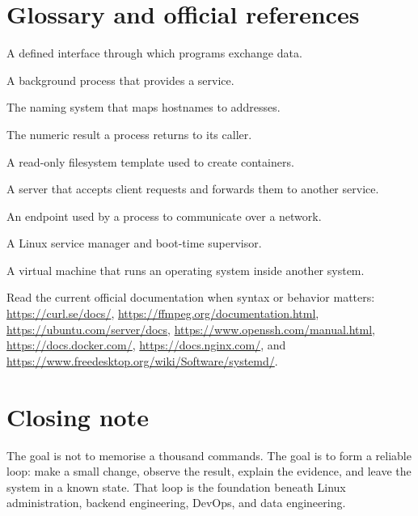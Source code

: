\documentclass[11pt,a4paper,openany]{book}
\begin{document}
\chapter{Glossary and official references}
\begin{description}[style=nextline,leftmargin=3.4cm,labelwidth=3.1cm]
\item[API] A defined interface through which programs exchange data.
\item[Daemon] A background process that provides a service.
\item[DNS] The naming system that maps hostnames to addresses.
\item[Exit status] The numeric result a process returns to its caller.
\item[Image] A read-only filesystem template used to create containers.
\item[Reverse proxy] A server that accepts client requests and forwards them to another service.
\item[Socket] An endpoint used by a process to communicate over a network.
\item[Systemd] A Linux service manager and boot-time supervisor.
\item[VM] A virtual machine that runs an operating system inside another system.
\end{description}
Read the current official documentation when syntax or behavior matters: \url{https://curl.se/docs/}, \url{https://ffmpeg.org/documentation.html}, \url{https://ubuntu.com/server/docs}, \url{https://www.openssh.com/manual.html}, \url{https://docs.docker.com/}, \url{https://docs.nginx.com/}, and \url{https://www.freedesktop.org/wiki/Software/systemd/}.
\backmatter
\chapter*{Closing note}
The goal is not to memorise a thousand commands. The goal is to form a reliable loop: make a small change, observe the result, explain the evidence, and leave the system in a known state. That loop is the foundation beneath Linux administration, backend engineering, DevOps, and data engineering.
\end{document}
